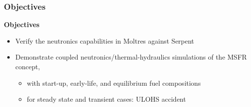 \begin{frame}
	\frametitle{Objectives}
		\textbf{Objectives}
		\begin{itemize}
			\item Verify the neutronics capabilities in Moltres against Serpent
			\cite{leppanen_serpent_2015}
			\item Demonstrate coupled neutronics/thermal-hydraulics simulations
			of the \gls{MSFR} concept,
			\begin{itemize}
				\item with start-up, early-life, and equilibrium fuel
				compositions
				\item for steady state and transient cases: \gls{ULOHS} accident
			\end{itemize}
		\end{itemize}
\end{frame}